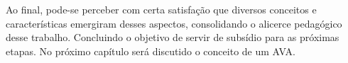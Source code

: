 Ao final, pode-se perceber com certa satisfação que diversos conceitos e características emergiram desses aspectos, consolidando o alicerce pedagógico desse trabalho. Concluindo o objetivo de servir de subsídio para as próximas etapas. No próximo capítulo será discutido o conceito de um AVA.
